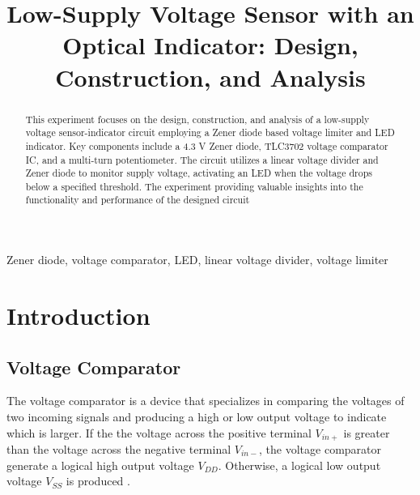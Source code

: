 \documentclass[conference]{IEEEtran}
\begin{document}
\title{ Low-Supply Voltage Sensor with an Optical Indicator: Design, Construction, and Analysis}

\author{
}

\maketitle

\begin{abstract}
This experiment focuses on the design, construction, and analysis of a low-supply voltage sensor-indicator circuit employing a Zener diode based voltage limiter and LED indicator. Key components include a 4.3 V Zener diode, TLC3702 voltage comparator IC, and a multi-turn potentiometer. The circuit utilizes a linear voltage divider and Zener diode to monitor supply voltage, activating an LED when the voltage drops below a specified threshold. The experiment providing valuable insights into the functionality and performance of the designed circuit


\end{abstract}

\begin{IEEEkeywords}
Zener diode, voltage comparator, LED, linear voltage divider, voltage limiter
\end{IEEEkeywords}

\section{Introduction}

\subsection{Voltage Comparator}

The voltage comparator is a device that specializes in comparing the voltages of two incoming signals and producing a high or low output voltage to indicate which is larger. If the the voltage across the positive terminal $V_{in+}$ is greater than the voltage across the negative terminal $V_{in-}$, the voltage comparator generate a logical high output voltage $V_{DD}$. Otherwise, a logical low output voltage $V_{SS}$ is produced \cite{week6}.
\end{document}
